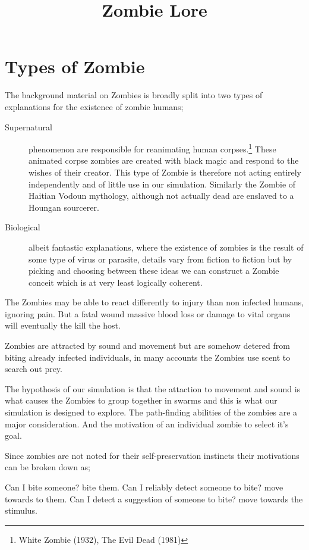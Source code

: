 
\pagestyle{empty}
\setcounter{section}{1}
\title{Zombie Lore}
\maketitle

\section{Types of Zombie}The background material on Zombies is broadly split into two types of explanations for the existence of zombie humans;
\begin{description}
\item[Supernatural] phenomenon are responsible for reanimating human corpses.\footnote{White Zombie (1932), The Evil Dead (1981)} These animated corpse zombies are created with black magic and respond to the wishes of their creator. This type of Zombie is therefore not acting entirely independently and of little use in our simulation. Similarly the Zombie of Haitian Vodoun mythology, although not actually dead are enslaved to a Houngan sourcerer.
\item[Biological] albeit fantastic explanations, where the existence of zombies is the result of some type of virus or parasite, details vary from fiction to fiction but by picking and choosing between these ideas we can construct a Zombie conceit which is at very least logically coherent.
\end{description}
The Zombies may be able to react differently to injury than non infected humans, ignoring pain. But a fatal wound massive blood loss or damage to vital organs will eventually the kill the host.

Zombies are attracted by sound and movement but are somehow detered from biting already infected individuals, in many accounts the Zombies use scent to search out prey.

The hypothosis of our simulation is that the attaction to movement and sound is what causes the Zombies to group together in swarms and this is what our simulation is designed to explore. The path-finding abilities of the zombies are a major consideration.
And the motivation of an individual zombie to select it's goal.

Since zombies are not noted for their self-preservation instincts their motivations can be broken down as;

Can I bite someone?  bite them.
Can I reliably detect someone to bite?  move towards to them.
Can I detect a suggestion of someone to bite?  move towards the stimulus.
\endinput
